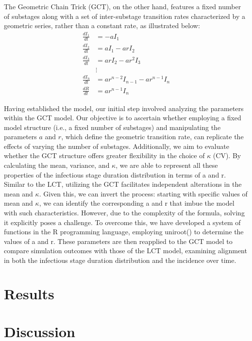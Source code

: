 \documentclass[12pt]{article}
\begin{document}
The Geometric Chain Trick (GCT), on the other hand, features a fixed number of substages along with a set of inter-substage transition rates characterized by a geometric series, rather than a constant rate, as illustrated below:
\begin{align}
    \frac{dI_1}{dt} &= - a I_1 \\
    \frac{dI_2}{dt} &= a I_1 - ar I_2 \\
    \frac{dI_3}{dt} &= ar I_2 - ar^2 I_3 \\
    &\vdots \\
    \frac{dI_n}{dt} &= ar^{n-2} I_{n-1} - ar^{n-1} I_n \\
    \frac{dR}{dt} &= ar^{n-1} I_n
\end{align}

Having established the model, our initial step involved analyzing the parameters within the GCT model. Our objective is to ascertain whether employing a fixed model structure (i.e., a fixed number of substages) and manipulating the parameters $a$ and $r$, which define the geometric transition rate, can replicate the effects of varying the number of substages. Additionally, we aim to evaluate whether the GCT structure offers greater flexibility in the choice of $\kappa$ (CV). By calculating the mean, variance, and $\kappa$, we are able to represent all these properties of the infectious stage duration distribution in terms of a and r. Similar to the LCT, utilizing the GCT facilitates independent alterations in the mean and $\kappa$. Given this, we can invert the process: starting with specific values of mean and $\kappa$, we can identify the corresponding a and r that imbue the model with such characteristics. However, due to the complexity of the formula, solving it explicitly poses a challenge. To overcome this, we have developed a system of functions in the R programming language, employing uniroot() to determine the values of a and r. These parameters are then reapplied to the GCT model to compare simulation outcomes with those of the LCT model, examining alignment in both the infectious stage duration distribution and the incidence over time.



\section*{Results}

\section{Discussion}
\end{document}
